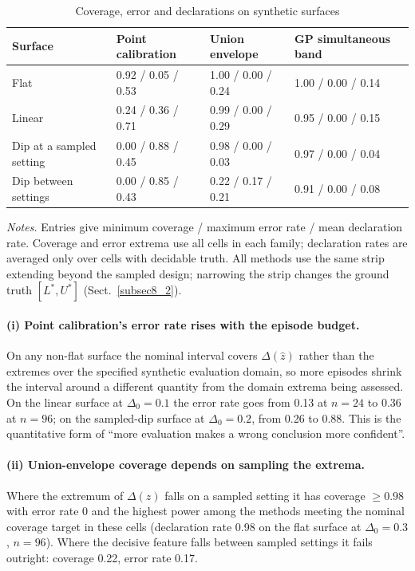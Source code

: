 \documentclass[pdflatex,iicol,sn-apa]{sn-jnl}
\theoremstyle{remark}
\newcommand{\tablenote}[1]{\par\vspace{4pt}\noindent
\begin{minipage}{\linewidth}\tablefootnotefont\raggedright #1\par\end{minipage}}
\begin{document}
\begin{table}[t]
\caption{Coverage, error and declarations on synthetic surfaces}\label{tab7}
\begin{tabular}{@{}llll@{}}
\toprule
Surface & Point calibration & Union envelope & GP simultaneous band \\
\midrule
Flat & 0.92 / 0.05 / 0.53 & 1.00 / 0.00 / 0.24 & 1.00 / 0.00 / 0.14 \\
Linear & 0.24 / 0.36 / 0.71 & 0.99 / 0.00 / 0.29 & 0.95 / 0.00 / 0.15 \\
Dip at a sampled setting & 0.00 / 0.88 / 0.45 & 0.98 / 0.00 / 0.03 & 0.97 / 0.00 / 0.04 \\
Dip between settings & 0.00 / 0.85 / 0.43 & 0.22 / 0.17 / 0.21 & 0.91 / 0.00 / 0.08 \\
\bottomrule
\end{tabular}
\tablenote{\textit{Notes.} Entries give minimum coverage / maximum error rate / mean declaration rate. Coverage and error extrema use all cells in each family; declaration rates are averaged only over cells with decidable truth. All methods use the same strip extending beyond the sampled design; narrowing the strip changes the ground truth $[L^*, U^*]$ (Sect.~\ref{subsec8_2}).}
\end{table}

\paragraph{(i) Point calibration's error rate rises with the episode budget.}
On any non-flat surface the nominal interval covers $\Delta(\hat z)$ rather than the extremes over
the specified synthetic evaluation domain, so more episodes shrink the interval around a
different quantity from the domain extrema being assessed. On the linear surface at $\Delta_0 = 0.1$ the error rate goes from 0.13 at $n = 24$ to
0.36 at $n = 96$; on the sampled-dip surface at $\Delta_0 = 0.2$, from 0.26 to 0.88. This is the
quantitative form of ``more evaluation makes a wrong conclusion more confident''.

\paragraph{(ii) Union-envelope coverage depends on sampling the extrema.}
Where the extremum of $\Delta(z)$ falls on a sampled setting it has coverage $\ge 0.98$ with error
rate 0 and the highest power among the methods meeting the nominal coverage target in these cells (declaration rate 0.98 on the flat surface at
$\Delta_0 = 0.3$, $n = 96$). Where the decisive feature falls between sampled settings it fails
outright: coverage 0.22, error rate 0.17.
\end{document}
